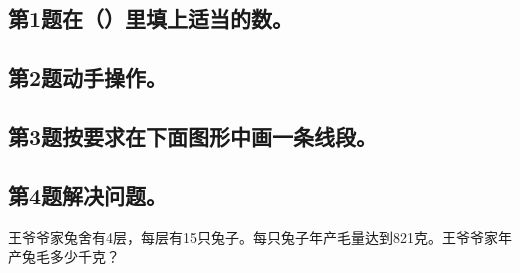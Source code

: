 \subsection*{第1题\quad 在（\hspace{28pt}）里填上适当的数。}
\subsection*{第2题\quad 动手操作。}
\subsection*{第3题\quad 按要求在下面图形中画一条线段。}
\subsection*{第4题\quad 解决问题。}
\noindent 王爷爷家兔舍有4层，每层有15只兔子。每只兔子年产毛量达到821克。王爷爷家年产兔毛多少千克？\par
{}
